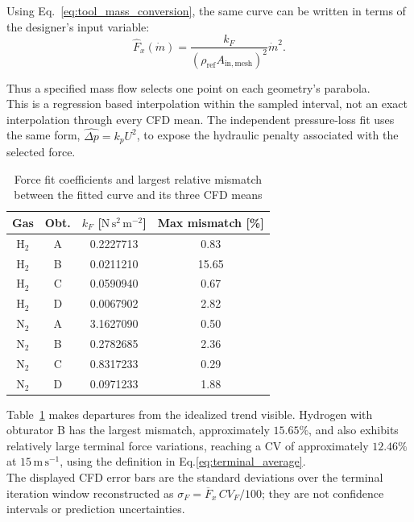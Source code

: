 Using Eq.~\eqref{eq:tool_mass_conversion}, the same curve can be written in terms of the designer’s input variable:
\begin{equation}
\widehat F_x(\dot m)=
\frac{k_F}{(\rho_{\mathrm{ref}}A_{\mathrm{in,mesh}})^2}\dot m^2.
\label{eq:tool_mass_parabola}
\end{equation}

Thus a specified mass flow selects one point on each geometry's parabola. \\
This is a regression based interpolation within the sampled interval, not an exact interpolation through every CFD mean. The independent pressure-loss fit uses the same form, $\widehat{\Delta p}=k_pU^2$, to expose the hydraulic penalty associated with the selected force.

\begin{table}[htbp]
\centering\small
\begin{tabular}{@{}cccc@{}}
\toprule
Gas & Obt. & $k_F$ [$\mathrm{N\,s^2\,m^{-2}}$] & Max mismatch [\%]\\
\midrule
$\mathrm{H}_2$ & A & 0.2227713 & 0.83\\
$\mathrm{H}_2$ & B & 0.0211210 & 15.65\\
$\mathrm{H}_2$ & C & 0.0590940 & 0.67\\
$\mathrm{H}_2$ & D & 0.0067902 & 2.82\\
$\mathrm{N}_2$ & A & 3.1627090 & 0.50\\
$\mathrm{N}_2$ & B & 0.2782685 & 2.36\\
$\mathrm{N}_2$ & C & 0.8317233 & 0.29\\
$\mathrm{N}_2$ & D & 0.0971233 & 1.88\\
\bottomrule
\end{tabular}
\caption{Force fit coefficients and largest relative mismatch between the fitted curve and its three CFD means}
\label{tab:tool_fit_quality}
\end{table}

Table~\ref{tab:tool_fit_quality} makes departures from the idealized trend visible.
Hydrogen with obturator B has the largest mismatch, approximately $15.65\%$, and also exhibits relatively large terminal force variations, reaching a CV of approximately $12.46\%$ at $15\,\mathrm{m\,s^{-1}}$, using the definition in Eq.\ref{eq:terminal_average}. \\

The displayed CFD error bars are the standard deviations over the terminal iteration window reconstructed as $\sigma_F=\overline F_x\,CV_F/100$; they are not confidence intervals or prediction uncertainties.

